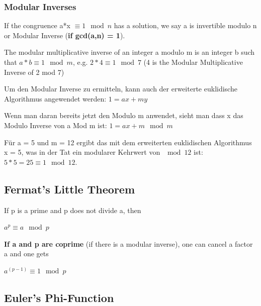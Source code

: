 \hypertarget{modular-inverses}{%
\subsubsection{Modular Inverses}\label{modular-inverses}}

If the congruence a*x $\equiv{1} \mod{n}$ has a solution, we say a is invertible
modulo n or Modular Inverse (\textbf{if gcd(a,n) = 1}).

The modular multiplicative inverse of an integer a modulo m is an integer b such that
$a*b \equiv 1 \mod m$,
e.g. $2*4  \equiv 1 \mod 7$ (4 is the Modular Multiplicative Inverse of 2 mod 7)

\begin{tcolorbox}[colback=red!5!white,colframe=red!75!black]
Um den Modular Inverse zu ermitteln, kann auch der erweiterte euklidische Algorithmus angewendet werden:
$1 = ax + my$

Wenn man daran bereits jetzt den Modulo m anwendet, sieht man dass x das Modulo Inverse von a Mod m ist:
$1 = ax + m \mod m$

Für a = 5 und m = 12 ergibt das mit dem erweiterten euklidischen Algorithmus x = 5, was in der Tat ein modularer Kehrwert von $\mod 12$ ist:
$5 * 5 = 25 \equiv 1 \mod 12.$
\end{tcolorbox}

\hypertarget{fermats-little-theorem}{%
\subsection{Fermat's Little Theorem}\label{fermats-little-theorem}}

If p is a prime and p does not divide a, then

\begin{tcolorbox}[colback=red!5!white,colframe=red!75!black]
$a^p \equiv a \mod p$
\end{tcolorbox}

\textbf{If a and p are coprime} (if there is a modular inverse), one can
cancel a factor a and one gets

\begin{tcolorbox}[colback=red!5!white,colframe=red!75!black]
$a^{(p-1)} \equiv 1 \mod p$
\end{tcolorbox}

\hypertarget{eulers-phi-function}{%
\subsection{Euler's Phi-Function}\label{eulers-phi-function}}

